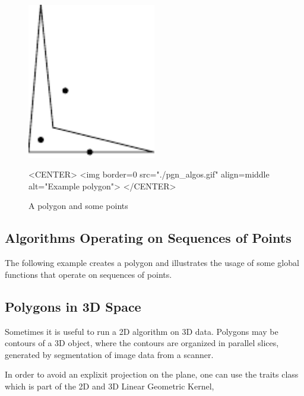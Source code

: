 


\begin{figure}
\begin{ccTexOnly}
\includegraphics[width=0.5\textwidth]{Polygon/pgn_algos}
\end{ccTexOnly}
\begin{ccHtmlOnly}
<CENTER>
<img border=0 src="./pgn_algos.gif" align=middle alt="Example polygon">
</CENTER>
\end{ccHtmlOnly}
\caption{A polygon and some points
\label{I1_Fig_a_polygon}}
\end{figure}

\subsection{Algorithms Operating on Sequences of Points}

The following example creates a polygon and illustrates the usage of some 
global functions that operate on sequences of points.



\subsection{Polygons in 3D Space}

Sometimes it is useful to run a 2D algorithm on 3D data.
Polygons may be contours of a 3D object, where the contours
are organized in parallel slices, generated by segmentation
of image data from a scanner.

In order to avoid an explixit projection on the  
plane, one can use the traits class   
which is part of the 2D and 3D Linear Geometric Kernel,

